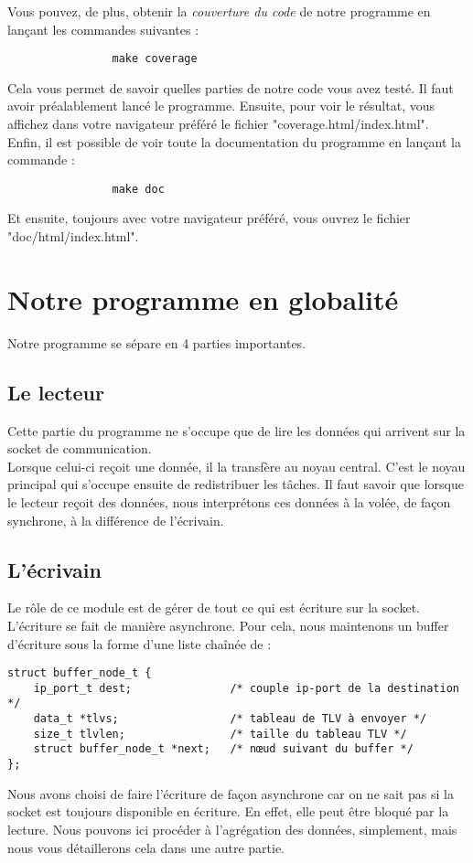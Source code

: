 \documentclass{FR16}
\begin{document}
Vous pouvez, de plus, obtenir la \textit{couverture du code} de notre programme en lançant les commandes suivantes :
\begin{verbatim}
                make coverage
\end{verbatim}
Cela vous permet de savoir quelles parties de notre code vous avez testé. Il faut avoir préalablement lancé le programme. Ensuite, pour voir le résultat, vous affichez dans votre navigateur préféré le fichier "coverage.html/index.html".\\

Enfin, il est possible de voir toute la documentation du programme en lançant la commande :
\begin{verbatim}
                make doc
\end{verbatim}
Et ensuite, toujours avec votre navigateur préféré, vous ouvrez le fichier "doc/html/index.html".

\newpage



\section{Notre programme en globalité}
Notre programme se sépare en 4 parties importantes.

\subsection{Le lecteur}
Cette partie du programme ne s'occupe que de lire les données qui arrivent sur la socket de communication.\\
Lorsque celui-ci reçoit une donnée, il la transfère au noyau central. C'est le noyau principal qui s'occupe ensuite de redistribuer les tâches. Il faut savoir que lorsque le lecteur reçoit des données, nous interprétons ces données à la volée, de façon synchrone, à la différence de l'écrivain.
 
\subsection{L'écrivain}
\label{ecrivain}
Le rôle de ce module est de gérer de tout ce qui est écriture sur la socket. L'écriture se fait de manière asynchrone. Pour cela, nous maintenons un buffer d'écriture sous la forme d'une liste chaînée de :
\begin{verbatim}
struct buffer_node_t {
    ip_port_t dest;               /* couple ip-port de la destination */
    data_t *tlvs;                 /* tableau de TLV à envoyer */
    size_t tlvlen;                /* taille du tableau TLV */
    struct buffer_node_t *next;   /* nœud suivant du buffer */
};
\end{verbatim}
Nous avons choisi de faire l'écriture de façon asynchrone car on ne sait pas si la socket est toujours disponible en écriture. En effet, elle peut être bloqué par la lecture. Nous pouvons ici procéder à l'agrégation des données, simplement, mais nous vous détaillerons cela dans une autre partie.
\end{document}
